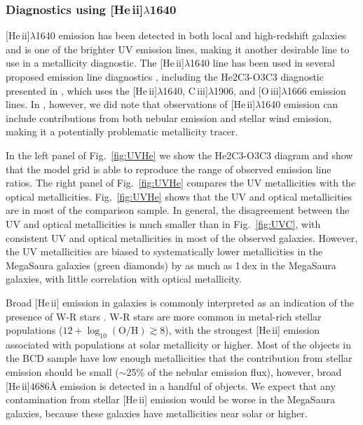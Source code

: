 \documentclass[preprint2]{aastex62}
\newcommand{\oiii}{[O\,{\sc iii}]\xspace}
\newcommand{\heii}{[He\,{\sc ii}]\xspace}
\newcommand{\ciii}{C\,{\sc iii}]\xspace}
\newcommand{\logten}{\ensuremath{\log_{10}}}
\newcommand{\logOH}{\ensuremath{\logten (\mathrm{O}/\mathrm{H})}\xspace}
\newcommand{\ang}{\ensuremath{\mbox{\AA}}\xspace}
\newcommand{\mage}{{\sc Meg}a{\sc S}a{\sc ura}\xspace}
\begin{document}
\subsubsection{Diagnostics using \heii$\lambda$1640}\label{sec:ZZ:UVOpt:He}

\heii$\lambda$1640 emission has been detected in both local and high-redshift galaxies and is one of the brighter UV emission lines, making it another desirable line to use in a metallicity diagnostic. The \heii$\lambda$1640 line has been used in several proposed emission line diagnostics \citep[e.g.,][]{Jaskot+2016, Feltre+2016}, including the He2C3-O3C3 diagnostic presented in \citet{Byler+2018}, which uses the \heii$\lambda$1640, \ciii$\lambda$1906, and \oiii$\lambda$1666 emission lines. In \citet{Byler+2018}, however, we did note that observations of \heii$\lambda$1640 emission can include contributions from both nebular emission and stellar wind emission, making it a potentially problematic metallicity tracer.

In the left panel of Fig.~\ref{fig:UVHe} we show the He2C3-O3C3 diagram and show that the model grid is able to reproduce the range of observed emission line ratios. The right panel of Fig.~\ref{fig:UVHe} compares the UV metallicities with the optical metallicities. Fig.~\ref{fig:UVHe} shows that the UV and optical metallicities are in most of the comparison sample. In general, the disagreement between the UV and optical metallicities is much smaller than in Fig.~\ref{fig:UVC}, with consistent UV and optical metallicities in most of the observed galaxies. However, the UV metallicities are biased to systematically lower metallicities in the \mage galaxies (green diamonds) by as much as 1\,dex in the \mage galaxies, with little correlation with optical metallicity.

Broad \heii emission in galaxies is commonly interpreted as an indication of the presence of W-R stars \citep[e.g., ][]{Kunth+1985,Conti+1991, Schaerer+1999, Brinchmann+2008}. W-R stars are more common in metal-rich stellar populations ($12+\logOH \gtrsim 8$), with the strongest \heii emission associated with populations at solar metallicity or higher. Most of the objects in the \citet{Berg+2016} BCD sample have low enough metallicities that the contribution from stellar emission should be small (${\sim}$25\% of the nebular emission flux), however, broad \heii$4686\ang$ emission is detected in a handful of objects. We expect that any contamination from stellar \heii emission would be worse in the \mage galaxies, because these galaxies have metallicities near solar or higher.
\end{document}
